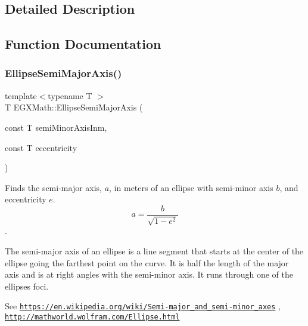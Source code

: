 \subsection{Detailed Description}


\subsection{Function Documentation}
\mbox{\label{group___e_g_x_math-_geometry-2_d-_ellipse-_semi_major_axis_ga646a2ca065f4ac3f666a9ea22f3bb527}} 
\subsubsection{\texorpdfstring{Ellipse\+Semi\+Major\+Axis()}{EllipseSemiMajorAxis()}}
{\footnotesize\ttfamily template$<$typename T $>$ \\
T E\+G\+X\+Math\+::\+Ellipse\+Semi\+Major\+Axis (\begin{DoxyParamCaption}\item[{const T}]{semi\+Minor\+Axis\+Inm,  }\item[{const T}]{eccentricity }\end{DoxyParamCaption})}



Finds the semi-\/major axis, $a$, in meters of an ellipse with semi-\/minor axis $b$, and eccentricity $e$. \[ a=\frac{b}{\sqrt{1-e^2}} \]. 

The semi-\/major axis of an ellipse is a line segment that starts at the center of the ellipse going the farthest point on the curve. It is half the length of the major axis and is at right angles with the semi-\/minor axis. It runs through one of the ellipses foci.

See \href{https://en.wikipedia.org/wiki/Semi-major_and_semi-minor_axes}{\tt https\+://en.\+wikipedia.\+org/wiki/\+Semi-\/major\+\_\+and\+\_\+semi-\/minor\+\_\+axes} , \href{http://mathworld.wolfram.com/Ellipse.html}{\tt http\+://mathworld.\+wolfram.\+com/\+Ellipse.\+html}


